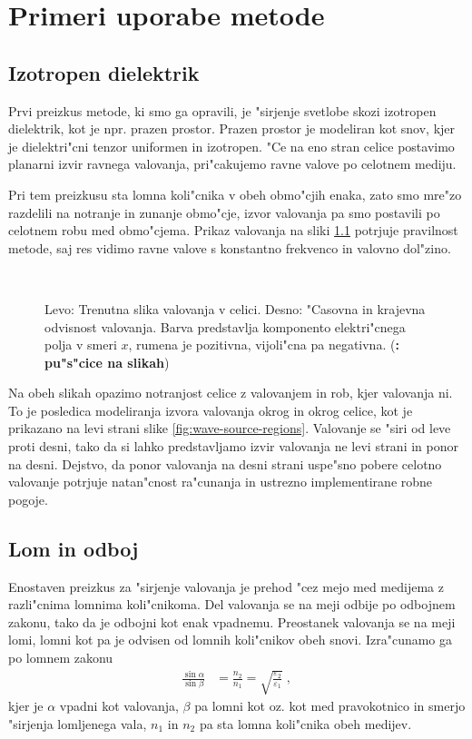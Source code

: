 \documentclass[12pt,twoside,openright,final]{report}
\newcommand{\todo}[1]{(\textbf{\textsmaller{TODO}: #1})}
\begin{document}
\chapter{Primeri uporabe metode}

\section{Izotropen dielektrik}
Prvi preizkus metode, ki smo ga opravili, je "sirjenje svetlobe skozi izotropen dielektrik, kot je npr. prazen prostor. 
Prazen prostor je modeliran kot snov, kjer je dielektri"cni tenzor uniformen in izotropen. 
"Ce na eno stran celice postavimo planarni izvir ravnega valovanja, pri"cakujemo ravne valove po celotnem mediju. 

Pri tem preizkusu sta lomna koli"cnika v obeh obmo"cjih enaka, zato smo mre"zo razdelili na notranje in zunanje obmo"cje, izvor valovanja pa smo postavili po celotnem robu med obmo"cjema. 
Prikaz valovanja na sliki \ref{fig:test-plane} potrjuje pravilnost metode, saj res vidimo ravne valove s konstantno frekvenco in valovno dol"zino. 

\begin{figure}[h]
 \centering
  \,
\caption{Levo: Trenutna slika valovanja v celici. Desno: "Casovna in krajevna odvisnost valovanja. Barva predstavlja komponento elektri"cnega polja v smeri $x$, rumena je pozitivna, vijoli"cna pa negativna. \todo{pu"s"cice na slikah}}
\label{fig:test-plane}
\end{figure}

Na obeh slikah opazimo notranjost celice z valovanjem in rob, kjer valovanja ni.
To je posledica modeliranja izvora valovanja okrog in okrog celice, kot je prikazano na levi strani slike \ref{fig:wave-source-regions}.
Valovanje se "siri od leve proti desni, tako da si lahko predstavljamo izvir valovanja ne levi strani in ponor na desni. 
Dejstvo, da ponor valovanja na desni strani uspe"sno pobere celotno valovanje potrjuje natan"cnost ra"cunanja in ustrezno implementirane robne pogoje. 

\section{Lom in odboj}
Enostaven preizkus za "sirjenje valovanja je prehod "cez mejo med medijema z razli"cnima lomnima koli"cnikoma. 
Del valovanja se na meji odbije po odbojnem zakonu, tako da je odbojni kot enak vpadnemu. 
Preostanek valovanja se na meji lomi, lomni kot pa je odvisen od lomnih koli"cnikov obeh snovi. 
Izra"cunamo ga po lomnem zakonu
\begin{align}
 \frac{\sin\alpha}{\sin\beta} &= \frac{n_2}{n_1} = \sqrt{\frac{\varepsilon_2}{\varepsilon_1}}\;, 
\end{align}
kjer je $\alpha$ vpadni kot valovanja, $\beta$ pa lomni kot oz. kot med pravokotnico in smerjo "sirjenja lomljenega vala, $n_1$ in $n_2$ pa sta lomna koli"cnika obeh medijev. 
\end{document}
